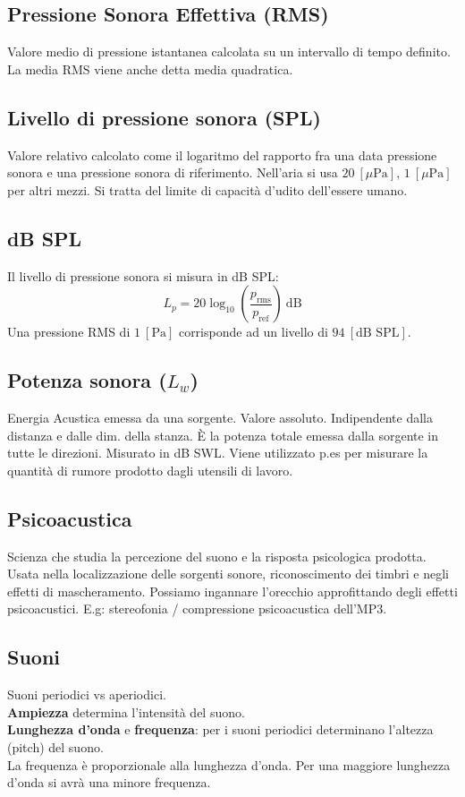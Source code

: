 \documentclass[8pt,a4paper]{article}
\begin{document}
\begin{multicols}{5}
    \subsection{Pressione Sonora Effettiva (RMS)}
    Valore medio di pressione istantanea calcolata su un intervallo di tempo
    definito. La media RMS viene anche detta media quadratica.
    
    \subsection{Livello di pressione sonora (SPL)}
    Valore relativo calcolato come il logaritmo del rapporto fra una data pressione
    sonora e una pressione sonora di riferimento. Nell'aria si usa $20\ [\mu \text{Pa}]$,
    $1\ [\mu \text{Pa}]$ per altri mezzi. Si tratta del limite di capacità d'udito 
    dell'essere umano.

    \subsection{dB SPL}
    Il livello di pressione sonora si misura in dB SPL:
    \begin{equation*}
      L_p = 20 \log_{10} (\frac{p_\text{rms}}{p_\text{ref}})\ \text{dB}
    \end{equation*}
    Una pressione RMS di $1\ [\text{Pa}]$ corrisponde ad un livello di $94
    \ [\text{dB SPL}]$.
    \subsection{Potenza sonora ($L_w$)}
    Energia Acustica emessa da una sorgente. Valore assoluto. Indipendente dalla
    distanza e dalle dim. della stanza. È la potenza totale emessa dalla sorgente
    in tutte le direzioni. Misurato in dB SWL. Viene utilizzato p.es per misurare
    la quantità di rumore prodotto dagli utensili di lavoro.

    \subsection{Psicoacustica}
    Scienza che studia la percezione del suono e la risposta psicologica prodotta.
    Usata nella localizzazione delle sorgenti sonore, riconoscimento dei timbri e
    negli effetti di mascheramento. Possiamo ingannare l'orecchio approfittando degli
    effetti psicoacustici. E.g: stereofonia / compressione psicoacustica dell'MP3.

    \subsection{Suoni}
    Suoni periodici vs aperiodici.\\
    \textbf{Ampiezza} determina l'intensità del suono. \\
    \textbf{Lunghezza d'onda} e \textbf{frequenza}: per i suoni periodici determinano
    l'altezza (pitch) del suono.\\
    La frequenza è proporzionale alla lunghezza d'onda. Per una maggiore lunghezza
    d'onda si avrà una minore frequenza.


\end{multicols}
\end{document}
